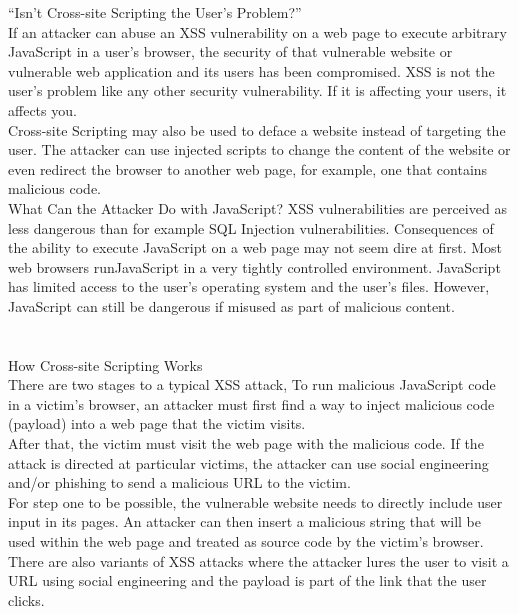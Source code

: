 \documentclass[a4paper, 12pt, fleqn]{article}
\begin{document}
\noindent
“Isn’t Cross-site Scripting the User’s Problem?” \\
If an attacker can abuse an XSS vulnerability on a web page to execute
arbitrary JavaScript in a user’s browser, the security of that vulnerable
website or vulnerable web application and its users has been
compromised. XSS is not the user’s problem like any other security
vulnerability. If it is affecting your users, it affects you. \\

\noindent
Cross-site Scripting may also be used to deface a website instead of
targeting the user. The attacker can use injected scripts to change the
content of the website or even redirect the browser to another web page,
for example, one that contains malicious code. \\

\noindent
What Can the Attacker Do with JavaScript?
XSS vulnerabilities are perceived as less dangerous than for example SQL
Injection vulnerabilities. Consequences of the ability to execute JavaScript
on a web page may not seem dire at first. Most web browsers runJavaScript in a very tightly controlled environment. JavaScript has limited
access to the user’s operating system and the user’s files. However,
JavaScript can still be dangerous if misused as part of malicious content.

\newpage
\section*{}

\noindent
How Cross-site Scripting Works \\
There are two stages to a typical XSS attack, 
To run malicious JavaScript code in a victim’s browser, an attacker must
first find a way to inject malicious code (payload) into a web page that the
victim visits. \\
After that, the victim must visit the web page with the malicious code. If the
attack is directed at particular victims, the attacker can use social
engineering and/or phishing to send a malicious URL to the victim. \\
For step one to be possible, the vulnerable website needs to directly
include user input in its pages. An attacker can then insert a malicious
string that will be used within the web page and treated as source code by
the victim’s browser. There are also variants of XSS attacks where the
attacker lures the user to visit a URL using social engineering and the
payload is part of the link that the user clicks. \\
\end{document}
